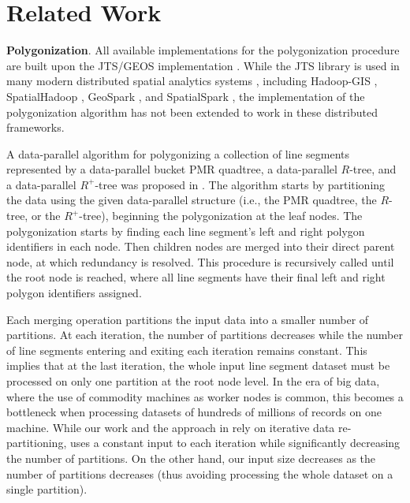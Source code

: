 \section{Related Work} %

\textbf{Polygonization}.
All available implementations for the polygonization procedure are built upon the JTS/GEOS implementation \cite{web:jts:polygonizer, web:geos:polygonizer}. While the JTS library is used in many modern distributed spatial analytics systems \cite{pandey_how_2021}, including Hadoop-GIS \cite{aji_hadoop-gis_2013}, SpatialHadoop  \cite{eldawy_spatialhadoop_2015}, GeoSpark \cite{yu_spatial_2018}, and SpatialSpark \cite{you_large-scale_2015}, the implementation of the polygonization algorithm \cite{web:jts:polygonizer} has not been extended to work in these distributed frameworks.

A data-parallel algorithm for polygonizing a collection of line segments represented by a data-parallel bucket PMR quadtree, a data-parallel $R$-tree, and a data-parallel $R^+$-tree was proposed in \cite{hoel_data-parallel_2003}.  The algorithm starts by partitioning the data using the given data-parallel structure (i.e., the PMR quadtree, the $R$-tree, or the $R^+$-tree), beginning the polygonization at the leaf nodes.  The polygonization starts by finding each line segment's left and right polygon  identifiers in each node. Then children nodes are merged into their direct parent node, at which redundancy is resolved. This procedure is recursively called until the root node is reached, where all line segments have their final left and right polygon identifiers assigned.

Each merging operation partitions the input data into a smaller number of partitions. At each iteration, the number of partitions decreases while the number of line segments entering and exiting each iteration remains constant.  This implies that at the last iteration, the whole input line segment dataset must be processed on only one partition at the root node level.  In the era of big data, where the use of commodity machines as worker nodes is common, this becomes a bottleneck when processing datasets of hundreds of millions of records on one machine.  While our work and the approach in \cite{hoel_data-parallel_2003} rely on iterative data re-partitioning, \cite{hoel_data-parallel_2003} uses a constant input to each iteration while significantly decreasing the number of partitions.  On the other hand, our input size decreases as the number of partitions decreases (thus avoiding processing the whole dataset on a single partition).

